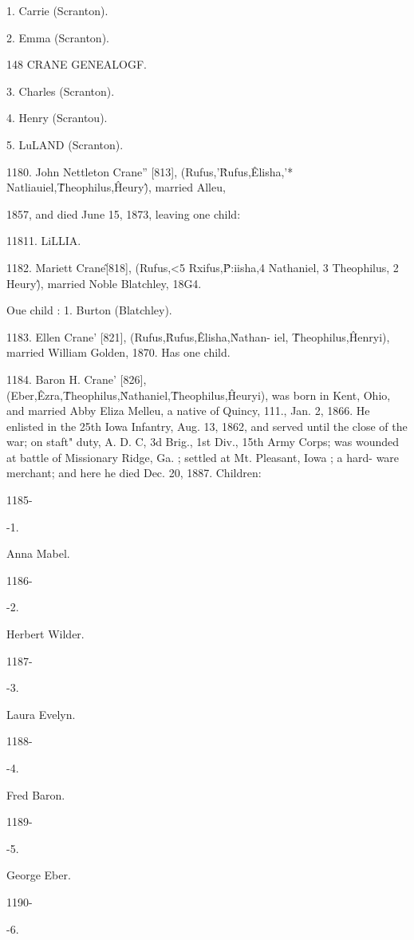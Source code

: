 \documentclass{book}
\begin{document}
1. Carrie (Scranton). 

2. Emma (Scranton). 



148 CRANE GENEALOGF. 

3. Charles (Scranton). 

4. Henry (Scrantou). 

5. LuLAND (Scranton). 

1180. John Nettleton Crane'' [813], (Rufus,'\^ Rufus,\^ 

Elisha,'* Natliauiel,\^ Theophilus,\^ Heury\^), married Alleu, 

1857, and died June 15, 1873, leaving one child: 

11811. LiLLIA. 

1182. Mariett Crane\^ [818], (Rufus,<5 Rxifus,\^ P:iisha,4 
Nathaniel, 3 Theophilus, 2 Heury\^), married Noble Blatchley, 18G4. 

Oue child : 
1. Burton (Blatchley). 

1183. Ellen Crane' [821], (Rufus,\^ Rufus,\^ Elisha,\^ Nathan- 
iel, \^ Theophilus,\^ Henryi), married William Golden, 1870. Has 
one child. 

1184. Baron H. Crane' [826], (Eber,\^ Ezra,\^ Theophilus,\^ 
Nathaniel,\^ Theophilus,\^ Heuryi), was born in Kent, Ohio, and 
married Abby Eliza Melleu, a native of Quincy, 111., Jan. 2, 
1866. He enlisted in the 25th Iowa Infantry, Aug. 13, 1862, 
and served until the close of the war; on staft" duty, A. D. C, 
3d Brig., 1st Div., 15th Army Corps; was wounded at battle of 
Missionary Ridge, Ga. ; settled at Mt. Pleasant, Iowa ; a hard- 
ware merchant; and here he died Dec. 20, 1887. Children: 



1185- 


-1. 


Anna Mabel. 


1186- 


-2. 


Herbert Wilder. 


1187- 


-3. 


Laura Evelyn. 


1188- 


-4. 


Fred Baron. 


1189- 


-5. 


George Eber. 


1190- 


-6. 
\end{document}
